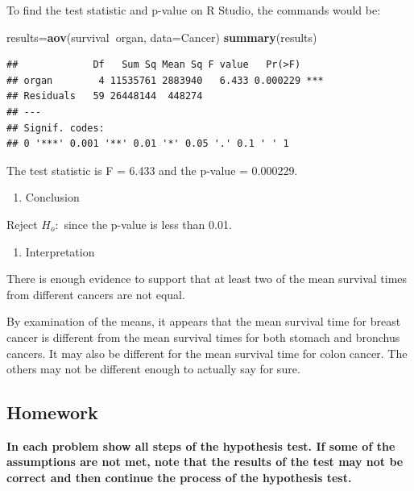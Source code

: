 \documentclass[
]{book}
\newenvironment{Shaded}{\begin{snugshade}}{\end{snugshade}}
\newcommand{\DataTypeTok}[1]{\textcolor[rgb]{0.13,0.29,0.53}{#1}}
\newcommand{\KeywordTok}[1]{\textcolor[rgb]{0.13,0.29,0.53}{\textbf{#1}}}
\newcommand{\NormalTok}[1]{#1}
\newcommand{\OperatorTok}[1]{\textcolor[rgb]{0.81,0.36,0.00}{\textbf{#1}}}
\providecommand{\tightlist}{%
  \setlength{\itemsep}{0pt}\setlength{\parskip}{0pt}}
\begin{document}
To find the test statistic and p-value on R Studio, the commands would be:

\begin{Shaded}
\begin{Highlighting}[]
\NormalTok{results=}\KeywordTok{aov}\NormalTok{(survival}\OperatorTok{~}\NormalTok{organ, }\DataTypeTok{data=}\NormalTok{Cancer)}
\KeywordTok{summary}\NormalTok{(results)}
\end{Highlighting}
\end{Shaded}

\begin{verbatim}
##             Df   Sum Sq Mean Sq F value   Pr(>F)    
## organ        4 11535761 2883940   6.433 0.000229 ***
## Residuals   59 26448144  448274                     
## ---
## Signif. codes:  
## 0 '***' 0.001 '**' 0.01 '*' 0.05 '.' 0.1 ' ' 1
\end{verbatim}

The test statistic is F = 6.433 and the p-value = 0.000229.

\begin{enumerate}
\def\labelenumi{\arabic{enumi}.}
\setcounter{enumi}{4}
\tightlist
\item
  Conclusion
\end{enumerate}

Reject \(H_o:\) since the p-value is less than 0.01.

\begin{enumerate}
\def\labelenumi{\arabic{enumi}.}
\setcounter{enumi}{5}
\tightlist
\item
  Interpretation
\end{enumerate}

There is enough evidence to support that at least two of the mean survival times from different cancers are not equal.

By examination of the means, it appears that the mean survival time for breast cancer is different from the mean survival times for both stomach and bronchus cancers. It may also be different for the mean survival time for colon cancer. The others may not be different enough to actually say for sure.

\hypertarget{homework-2}{%
\subsection{Homework}\label{homework-2}}

\textbf{In each problem show all steps of the hypothesis test. If some of the assumptions are not met, note that the results of the test may not be correct and then continue the process of the hypothesis test.}
\end{document}
